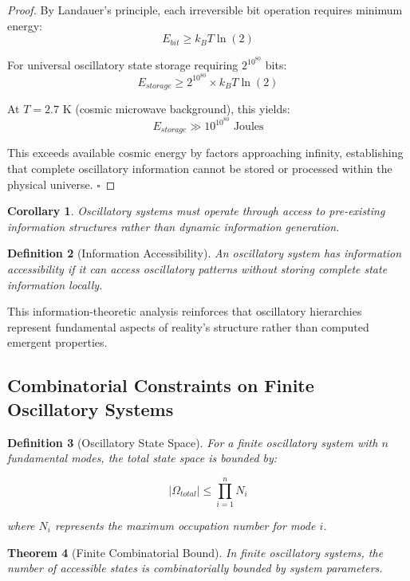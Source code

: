 \documentclass[11pt]{article}
\newtheorem{theorem}{Theorem}[section]
\newtheorem{corollary}[theorem]{Corollary}
\newtheorem{definition}[theorem]{Definition}
\theoremstyle{remark}
\begin{document}
\begin{proof}
By Landauer's principle, each irreversible bit operation requires minimum energy:
$$E_{bit} \geq k_B T \ln(2)$$

For universal oscillatory state storage requiring $2^{10^{80}}$ bits:
$$E_{storage} \geq 2^{10^{80}} \times k_B T \ln(2)$$

At $T = 2.7$ K (cosmic microwave background), this yields:
$$E_{storage} \gg 10^{10^{80}} \text{ Joules}$$

This exceeds available cosmic energy by factors approaching infinity, establishing that complete oscillatory information cannot be stored or processed within the physical universe. $\square$
\end{proof}

\begin{corollary}
Oscillatory systems must operate through access to pre-existing information structures rather than dynamic information generation.
\end{corollary}

\begin{definition}[Information Accessibility]
An oscillatory system has information accessibility if it can access oscillatory patterns without storing complete state information locally.
\end{definition}

This information-theoretic analysis reinforces that oscillatory hierarchies represent fundamental aspects of reality's structure rather than computed emergent properties.

\subsection{Combinatorial Constraints on Finite Oscillatory Systems}

\begin{definition}[Oscillatory State Space]
For a finite oscillatory system with $n$ fundamental modes, the total state space is bounded by:

$$|\Omega_{total}| \leq \prod_{i=1}^{n} N_i$$

where $N_i$ represents the maximum occupation number for mode $i$.
\end{definition}

\begin{theorem}[Finite Combinatorial Bound]
In finite oscillatory systems, the number of accessible states is combinatorially bounded by system parameters.
\end{theorem}
\end{document}
